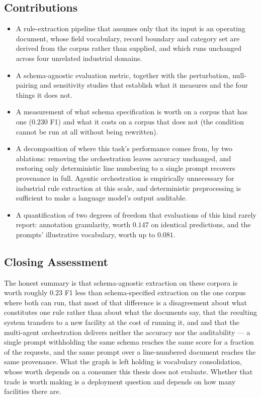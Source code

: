 \documentclass[11pt]{article}
\begin{document}
\subsection{Contributions}
\begin{itemize}
    \item A rule-extraction pipeline that assumes only that its input is an
          operating document, whose field vocabulary, record boundary and
          category set are derived from the corpus rather than supplied, and
          which runs unchanged across four unrelated industrial domains.
    \item A schema-agnostic evaluation metric, together with the perturbation,
          null-pairing and sensitivity studies that establish what it measures
          and the four things it does not.
    \item A measurement of what schema specification is worth on a corpus that
          has one ($0.230$ F1) and what it costs on a corpus that does not
          (the condition cannot be run at all without being rewritten).
    \item A decomposition of where this task's performance comes from, by two
          ablations: removing the orchestration leaves accuracy unchanged, and
          restoring only deterministic line numbering to a single prompt
          recovers provenance in full. Agentic orchestration is empirically
          unnecessary for industrial rule extraction at this scale, and
          deterministic preprocessing is sufficient to make a language model's
          output auditable.
    \item A quantification of two degrees of freedom that evaluations of this
          kind rarely report: annotation granularity, worth $0.147$ on identical
          predictions, and the prompts' illustrative vocabulary, worth up to
          $0.081$.
\end{itemize}

\subsection{Closing Assessment}
The honest summary is that schema-agnostic extraction on these corpora is worth
roughly $0.23$ F1 less than schema-specified extraction on the one corpus where
both can run, that most of that difference is a disagreement about what
constitutes one rule rather than about what the documents say, that the
resulting system transfers to a new facility at the cost of running it, and
and that the multi-agent orchestration delivers neither the accuracy nor the
auditability --- a single prompt withholding the same schema reaches the same
score for a fraction of the requests, and the same prompt over a line-numbered
document reaches the same provenance. What the graph is left holding is
vocabulary consolidation, whose worth depends on a consumer this thesis does not
evaluate. Whether
that trade is worth making is a deployment question and depends on how many
facilities there are.
\end{document}
